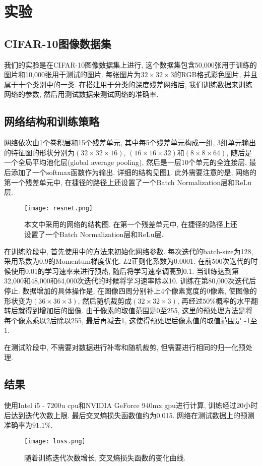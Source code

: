 \section{实验}
\subsection{CIFAR-10图像数据集}
我们的实验是在CIFAR-10图像数据集\cite{Krizhevsky2009LearningML}上进行, 这个数据集包含50,000张用于训练的图片和10,000张用于测试的图片. 每张图片为$32\times32\times3$的RGB格式彩色图片, 并且属于十个类别中的一类. 在搭建用于分类的深度残差网络后, 我们训练数据来训练网络的参数, 然后用测试数据来测试网络的准确率.

\subsection{网络结构和训练策略}
网络依次由1个卷积层和15个残差单元, 其中每5个残差单元构成一组, 3组单元输出的特征图的形状分别为$(32\times32\times16)$, $(16\times16\times32)$和$(8\times8\times64)$, 随后是一个全局平均池化层(global average pooling)\cite{Lin2013NetworkIN}, 然后是一层10个单元的全连接层, 最后添加了一个softmax函数作为输出. 详细的结构见图\ref{resnet}. 此外需要注意的是, 网络的第一个残差单元中, 在捷径的路径上还设置了一个Batch Normalization层和ReLu层.


\begin{figure}[!htbp]
\centering
\texttt{[image: resnet.png]}
\caption{本文中采用的网络的结构图. 在第一个残差单元中, 在捷径的路径上还设置了一个Batch Normalization层和ReLu层.}
\label{resnet} 
\end{figure}

在训练阶段中, 首先使用\cite{He2015DelvingDI}中的方法来初始化网络参数. 每次迭代的batch-size为128, 采用系数为0.9的Momentum梯度优化. $L2$正则化系数为0.0001. 在前500次迭代的时候使用0.01的学习速率来进行预热, 随后将学习速率调高到0.1. 当训练达到第32,000和48,000和64,000次迭代的时候将学习速率除以10. 训练在第80,000次迭代后停止. 数据增加的具体操作是, 在图像四周分别补上4个像素宽度的0像素, 使图像的形状变为$(36\times36\times3)$, 然后随机裁剪成$(32\times32\times3)$, 再经过$50\%$概率的水平翻转后就得到增加后的图像. 由于像素的取值范围是0至255, 这里的预处理方法是将每个像素乘以2后除以255, 最后再减去1, 这使得预处理后像素值的取值范围是 -1至1.

在测试阶段中, 不需要对数据进行补零和随机裁剪, 但需要进行相同的归一化预处理.

\subsection{结果}
使用Intel i5 - 7200u cpu和NVIDIA GeForce 940mx gpu进行计算, 训练经过20小时后达到迭代次数上限. 最后交叉熵损失函数值约为0.015. 网络在测试数据上的预测准确率为$91.1\%$.
\begin{figure}[!htbp]
\centering
\texttt{[image: loss.png]}
\caption{随着训练迭代次数增长, 交叉熵损失函数的变化曲线.}
\label{loss} 
\end{figure}


